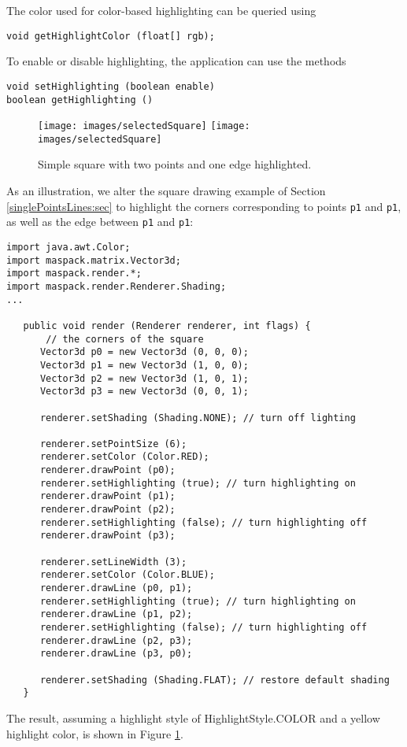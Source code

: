 The color used for color-based highlighting can be queried using
%
\begin{lstlisting}[]
void getHighlightColor (float[] rgb);
\end{lstlisting}
%

To enable or disable highlighting, the application can use
the methods 
%
\begin{lstlisting}[]
void setHighlighting (boolean enable)
boolean getHighlighting ()
\end{lstlisting}
%
\begin{figure}[t]
\begin{center}
\iflatexml
 \texttt{[image: images/selectedSquare]}
\else
 \texttt{[image: images/selectedSquare]}
\fi
\end{center}
\caption{Simple square with two points and one edge highlighted.}
\label{selectedSquare:fig}
\end{figure}
%
As an illustration, we alter the square drawing example of Section
\ref{singlePointsLines:sec} to highlight the corners corresponding
to points {\tt p1} and {\tt p1}, as well as the edge
between {\tt p1} and {\tt p1}:
%
\begin{lstlisting}[]
import java.awt.Color;
import maspack.matrix.Vector3d;
import maspack.render.*;
import maspack.render.Renderer.Shading;
...
   
   public void render (Renderer renderer, int flags) {
       // the corners of the square
      Vector3d p0 = new Vector3d (0, 0, 0);
      Vector3d p1 = new Vector3d (1, 0, 0);
      Vector3d p2 = new Vector3d (1, 0, 1);
      Vector3d p3 = new Vector3d (0, 0, 1);
      
      renderer.setShading (Shading.NONE); // turn off lighting
   
      renderer.setPointSize (6);
      renderer.setColor (Color.RED);
      renderer.drawPoint (p0);
      renderer.setHighlighting (true); // turn highlighting on
      renderer.drawPoint (p1);
      renderer.drawPoint (p2);
      renderer.setHighlighting (false); // turn highlighting off
      renderer.drawPoint (p3);
   
      renderer.setLineWidth (3);
      renderer.setColor (Color.BLUE);
      renderer.drawLine (p0, p1);
      renderer.setHighlighting (true); // turn highlighting on
      renderer.drawLine (p1, p2);
      renderer.setHighlighting (false); // turn highlighting off
      renderer.drawLine (p2, p3);        
      renderer.drawLine (p3, p0);        
   
      renderer.setShading (Shading.FLAT); // restore default shading
   }
\end{lstlisting}
%
The result, assuming a highlight style of
%
{HighlightStyle.COLOR} and a yellow
highlight color, is shown in Figure \ref{selectedSquare:fig}.

